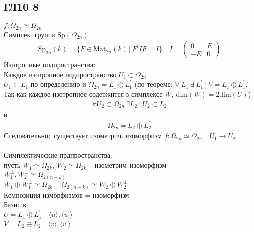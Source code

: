 \subsection*{ГЛ10 8}
$f: \Omega_{2n} \simeq \Omega_{2n}$\\
Симплек. группа $\text{Sp}(\Omega_{2n})$
\begin{gather*}
	\text{Sp}_{2n}(k) = \{F \in \text{Mat}_{2n}(k)\ |\ F^t IF = I\}\quad I = 
	\begin{pmatrix}
		0 & E\\
		-E & 0
	\end{pmatrix}
\end{gather*}
Изотропные подпространства:\\
Каждое изотропное подпространство $U_1 \subset \Omega_{2n}$\\
$U_1 \subset L_1$ по определению и $\Omega_{2n} = L_1 \oplus L_1^{\prime}$ (по теореме: $\forall\ L_1\ \exists\ L_1^{\prime}\ |\ V = L_1 \oplus L_1^{\prime}$. Так как каждое изотропное содержится в симплексе $W,\ \text{dim}(W) = 2\text{dim}(U)$)
\begin{gather*}
	\forall U_2 \subset \Omega_{2n}\ \exists L_2\ |\ U_2 \subset L_2
\end{gather*}
и
\begin{gather*}
	\Omega_{2n} = L_2 \oplus L_2^{\prime}
\end{gather*}
Следовательнос существует изометрич. изоморфизм $f: \Omega_{2n} \simeq \Omega_{2n}\quad U_1 \to U_2$\\
\\
Симплектические прдпространства:\\
пусть $W_1 \simeq \Omega_{2k},\ W_2 \simeq \Omega_{2k}$ -- изометрич. изоморфизм\\
$W_1^{\perp}, W_2^{\perp} \simeq \Omega_{2(n-k)}$\\
$W_1 \oplus W_1^{\perp} \simeq \Omega_{2k} + \Omega_{2(n-k)} \simeq W_2 \oplus W_2^{\perp}$\\
Композиция изморфизмов = изоморфизм\\
Базис в\\
$U = L_1 \oplus L_1^{\prime}\quad \langle u \rangle, \langle u^{\prime} \rangle$\\
$V = L_2 \oplus L_2^{\prime}\quad \langle v \rangle, \langle v^{\prime} \rangle$
